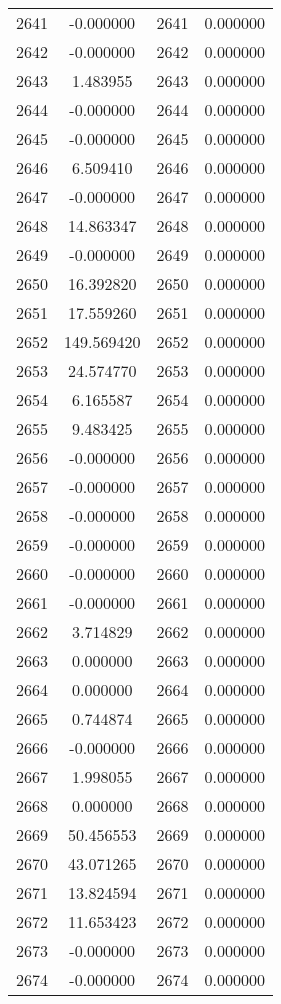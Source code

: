 \documentclass[12pt]{article}
\begin{document}
\begin{longtable}{@{}cccc@{}}
2641 & -0.000000 & 2641 & 0.000000 \\
2642 & -0.000000 & 2642 & 0.000000 \\
2643 & 1.483955 & 2643 & 0.000000 \\
2644 & -0.000000 & 2644 & 0.000000 \\
2645 & -0.000000 & 2645 & 0.000000 \\
2646 & 6.509410 & 2646 & 0.000000 \\
2647 & -0.000000 & 2647 & 0.000000 \\
2648 & 14.863347 & 2648 & 0.000000 \\
2649 & -0.000000 & 2649 & 0.000000 \\
2650 & 16.392820 & 2650 & 0.000000 \\
2651 & 17.559260 & 2651 & 0.000000 \\
2652 & 149.569420 & 2652 & 0.000000 \\
2653 & 24.574770 & 2653 & 0.000000 \\
2654 & 6.165587 & 2654 & 0.000000 \\
2655 & 9.483425 & 2655 & 0.000000 \\
2656 & -0.000000 & 2656 & 0.000000 \\
2657 & -0.000000 & 2657 & 0.000000 \\
2658 & -0.000000 & 2658 & 0.000000 \\
2659 & -0.000000 & 2659 & 0.000000 \\
2660 & -0.000000 & 2660 & 0.000000 \\
2661 & -0.000000 & 2661 & 0.000000 \\
2662 & 3.714829 & 2662 & 0.000000 \\
2663 & 0.000000 & 2663 & 0.000000 \\
2664 & 0.000000 & 2664 & 0.000000 \\
2665 & 0.744874 & 2665 & 0.000000 \\
2666 & -0.000000 & 2666 & 0.000000 \\
2667 & 1.998055 & 2667 & 0.000000 \\
2668 & 0.000000 & 2668 & 0.000000 \\
2669 & 50.456553 & 2669 & 0.000000 \\
2670 & 43.071265 & 2670 & 0.000000 \\
2671 & 13.824594 & 2671 & 0.000000 \\
2672 & 11.653423 & 2672 & 0.000000 \\
2673 & -0.000000 & 2673 & 0.000000 \\
2674 & -0.000000 & 2674 & 0.000000 \\

\end{longtable}
\end{document}
